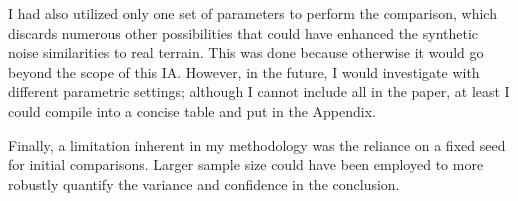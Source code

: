 I had also utilized only one set of parameters to perform the comparison, which discards numerous other possibilities that could have enhanced the synthetic noise 
similarities to real terrain. This was done because otherwise it would go beyond the scope of this IA. However, in the future, I would investigate with different 
parametric settings; although I cannot include all in the paper, at least I could compile into a concise table and put in the Appendix. 

Finally, a limitation inherent in my methodology was the reliance on a fixed seed for initial comparisons. Larger sample size could have been employed to more 
robustly quantify the variance and confidence in the conclusion. 
